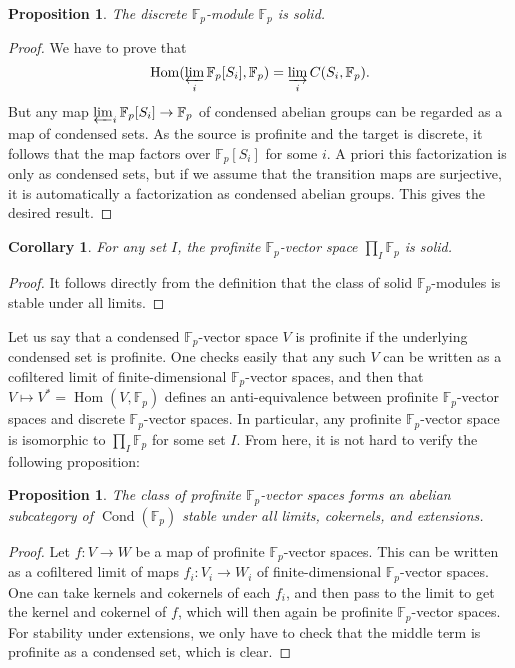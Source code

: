 \documentclass[11pt]{amsbook}
\DeclareMathOperator{\Hom}{Hom}
\DeclareMathOperator{\Cond}{Cond}
\numberwithin{equation}{section}
\numberwithin{theorem}{section}
\newtheorem{corollary}[theorem]{Corollary}
\newtheorem{proposition}[theorem]{Proposition}
\theoremstyle{definition}
\begin{document}
\begin{proposition} The discrete $\mathbb F_p$-module $\mathbb F_p$ is solid.
\end{proposition}

\begin{proof} We have to prove that
\[
\Hom(\varprojlim_i \mathbb F_p[S_i],\mathbb F_p)=\varinjlim_i C(S_i,\mathbb F_p).
\]
But any map $\varprojlim_i \mathbb F_p[S_i]\to \mathbb F_p$ of condensed abelian groups can be regarded as a map of condensed sets. As the source is profinite and the target is discrete, it follows that the map factors over $\mathbb F_p[S_i]$ for some $i$. A priori this factorization is only as condensed sets, but if we assume that the transition maps are surjective, it is automatically a factorization as condensed abelian groups. This gives the desired result.
\end{proof}

\begin{corollary} For any set $I$, the profinite $\mathbb F_p$-vector space $\prod_I \mathbb F_p$ is solid.
\end{corollary}

\begin{proof} It follows directly from the definition that the class of solid $\mathbb F_p$-modules is stable under all limits.
\end{proof}

Let us say that a condensed $\mathbb F_p$-vector space $V$ is profinite if the underlying condensed set is profinite. One checks easily that any such $V$ can be written as a cofiltered limit of finite-dimensional $\mathbb F_p$-vector spaces, and then that $V\mapsto V^\ast=\Hom(V,\mathbb F_p)$ defines an anti-equivalence between profinite $\mathbb F_p$-vector spaces and discrete $\mathbb F_p$-vector spaces. In particular, any profinite $\mathbb F_p$-vector space is isomorphic to $\prod_I \mathbb F_p$ for some set $I$. From here, it is not hard to verify the following proposition:

\begin{proposition} The class of profinite $\mathbb F_p$-vector spaces forms an abelian subcategory of $\Cond(\mathbb F_p)$ stable under all limits, cokernels, and extensions.
\end{proposition}

\begin{proof} Let $f: V\to W$ be a map of profinite $\mathbb F_p$-vector spaces. This can be written as a cofiltered limit of maps $f_i: V_i\to W_i$ of finite-dimensional $\mathbb F_p$-vector spaces. One can take kernels and cokernels of each $f_i$, and then pass to the limit to get the kernel and cokernel of $f$, which will then again be profinite $\mathbb F_p$-vector spaces. For stability under extensions, we only have to check that the middle term is profinite as a condensed set, which is clear.
\end{proof}
\end{document}
